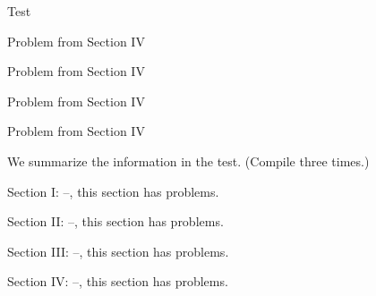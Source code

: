 \documentclass{article}
\begin{document}
\begin{exam}{Test\nExam}
\begin{problem}[5]
Problem from Section IV
\end{problem}

\begin{problem}[5]
Problem from Section IV
\end{problem}

\begin{problem}[5]
Problem from Section IV
\end{problem}

\begin{problem}[5]
Problem from Section IV
\end{problem}


\end{exam}

\parindent0pt \parskip6pt

We summarize the information in the test. (Compile three times.)

Section I: --, this section
has  problems.

Section II: --, this section
has  problems.

Section III: --, this section
has  problems.

Section IV: --, this section
has  problems.
\end{document}

